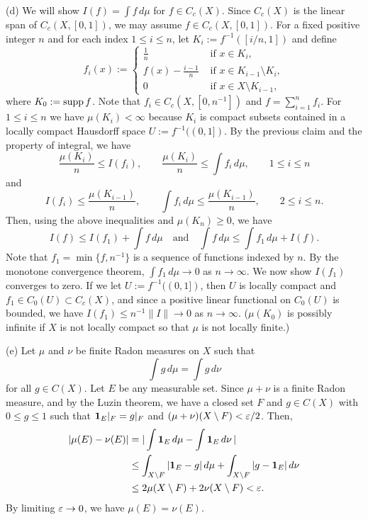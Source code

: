 \documentclass{../../large}
\begin{document}
\begin{pf}
(d)
We will show $I(f)=\int f\,d\mu$ for $f\in C_c(X)$.
Since $C_c(X)$ is the linear span of $C_c(X,[0,1])$, we may assume $f\in C_c(X,[0,1])$.
For a fixed positive integer $n$ and for each index $1\le i\le n$, let $K_i:=f^{-1}([i/n,1])$ and define
\[f_i(x):=\begin{cases}\frac1n&\text{ if }x\in K_i,\\f(x)-\frac{i-1}n&\text{ if }x\in K_{i-1}\setminus K_i,\\0&\text{ if }x\in X\setminus K_{i-1},\end{cases}\]
where $K_0:=\operatorname{supp} f$.
Note that $f_i\in C_c(X,[0,n^{-1}])$ and $f=\sum_{i=1}^nf_i$.
For $1\le i\le n$ we have $\mu(K_i)<\infty$ because $K_i$ is compact subsets contained in a locally compact Hausdorff space $U:=f^{-1}((0,1])$.
By the previous claim and the property of integral, we have
\[\frac{\mu(K_i)}n\le I(f_i),\qquad\frac{\mu(K_i)}n\le\int f_i\,d\mu,\qquad1\le i\le n\]
and
\[I(f_i)\le\frac{\mu(K_{i-1})}n,\qquad\int f_i\,d\mu\le\frac{\mu(K_{i-1})}n,\qquad2\le i\le n.\]
Then, using the above inequalities and $\mu(K_n)\ge0$, we have
\[I(f)\le I(f_1)+\int f\,d\mu\quad\text{and}\quad\int f\,d\mu\le\int f_1\,d\mu+I(f).\]
Note that $f_1=\min\{f,n^{-1}\}$ is a sequence of functions indexed by $n$.
By the monotone convergence theorem, $\int f_1\,d\mu\to0$ as $n\to\infty$.
We now show $I(f_1)$ converges to zero.
If we let $U:=f^{-1}((0,1])$, then $U$ is locally compact and $f_1\in C_0(U)\subset C_c(X)$, and since a positive linear functional on $C_0(U)$ is bounded, we have $I(f_1)\le n^{-1}\|I\|\to0$ as $n\to\infty$.
($\mu(K_0)$ is possibly infinite if $X$ is not locally compact so that $\mu$ is not locally finite.)

(e)
Let $\mu$ and $\nu$ be finite Radon measures on $X$ such that
\[\int g\,d\mu=\int g\,d\nu\]
for all $g\in C(X)$.
Let $E$ be any measurable set.
Since $\mu+\nu$ is a finite Radon measure, and by the Luzin theorem, we have a closed set $F$ and $g\in C(X)$ with $0\le g\le1$ such that $\mathbf{1}_E|_F=g|_F$ and $(\mu+\nu)(X\setminus F)<\varepsilon/2$.
Then,
\begin{align*}
|\mu(E)-\nu(E)|&=|\int\mathbf{1}_E\,d\mu-\int\mathbf{1}_E\,d\nu\,|\\
&\le\int_{X\setminus F}|\mathbf{1}_E-g|\,d\mu+\int_{X\setminus F}|g-\mathbf{1}_E|\,d\nu\\
&\le2\mu(X\setminus F)+2\nu(X\setminus F)<\varepsilon.
\end{align*}
By limiting $\varepsilon\to0$, we have $\mu(E)=\nu(E)$.
\end{pf}


\begin{prb}
\end{prb}
\end{document}

